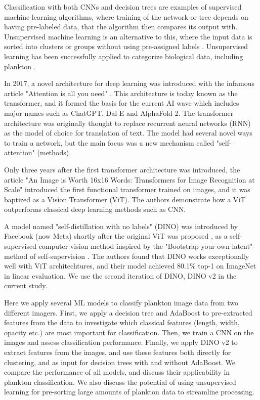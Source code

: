 Classification with both CNNs and decision trees are examples of supervised machine learning algorithms, where training of the network or tree depends on having pre-labeled data, that the algorithm then compares its output with. Unsupervised machine learning is an alternative to this, where the input data is sorted into clusters or groups without using pre-assigned labels \cite{olaode2014}. Unsupervised learning has been successfully applied to categorize biological data, including plankton \cite{pastore2023}.

In 2017, a novel architecture for deep learning was introduced with the infamous article "Attention is all you need" \cite{attention}. This architecture is today known as the transformer, and it formed the basis for the current AI wave which includes major names such as ChatGPT, Dal-E and AlphaFold 2. The transformer architecture was originally thought to replace recurrent neural networks (RNN) as the model of choice for translation of text. The model had several novel ways to train a network,
but the main focus was a new mechanism called "self-attention" (methods).

Only three years after the first transformer architecture was introduced, the article "An Image is Worth 16x16 Words: Transformers for Image Recognition at Scale" \cite{first_vit} introduced the first functional transformer trained on images, and it was baptized as a Vision Transformer (ViT). The authors demonstrate how a ViT outperforms classical deep learning methods such as CNN. 

A model named "self-distillation with no labels" (DINO) was introduced by Facebook (now Meta) shortly after the original ViT was proposed \cite{dino1}, as a self-supervised computer vision method inspired by the "Bootstrap your own latent"-method of self-supervision \cite{byol}. The authors found that DINO works exceptionally well with ViT architechtures, and their model achieved 80.1\% top-1 on ImageNet in linear evaluation. We use the second iteration of DINO, DINO v2 \cite{dino2} in the current study.

Here we apply several ML models to classify plankton image data from two different imagers. First, we apply a decision tree and AdaBoost to pre-extracted features from the data to investigate which classical features (length, width, opacity etc.) are most important for classification. Then, we train a CNN on the images and assess classification performance. Finally, we apply DINO v2 to extract features from the images, and use these features both directly for clustering, and as input for decision trees with and without AdaBoost. We compare the performance of all models, and discuss their applicability in plankton classification. We also discuss the potential of using unsupervised learning for pre-sorting large amounts of plankton data to streamline processing.